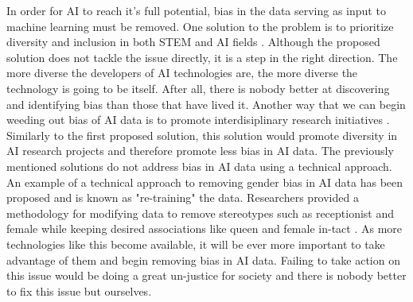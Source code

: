 \documentclass[12pt]{article}
\begin{document}
In order for AI to reach it's full potential, bias in the data serving as input to machine learning must be removed. One solution to the problem is to prioritize diversity and inclusion in both STEM and AI fields \cite{gov}. Although the proposed solution does not tackle the issue directly, it is a step in the right direction. The more diverse the developers of AI technologies are, the more diverse the technology is going to be itself. After all, there is nobody better at discovering and identifying bias than those that have lived it. Another way that we can begin weeding out bias of AI data is to promote interdisiplinary research initiatives \cite[pg. 5]{now}. Similarly to the first proposed solution, this solution would promote diversity in AI research projects and therefore promote less bias in AI data. The previously mentioned solutions do not address bias in AI data using a technical approach. An example of a technical approach to removing gender bias in AI data has been proposed and is known as "re-training" the data. Researchers provided a methodology for modifying data to remove stereotypes such as receptionist and female while keeping desired associations like queen and female in-tact \cite{debiasing}. As more technologies like this become available, it will be ever more important to take advantage of them and begin removing bias in AI data. Failing to take action on this issue would be doing a great un-justice for society and there is nobody better to fix this issue but ourselves.

\newpage

{}

\end{document}
